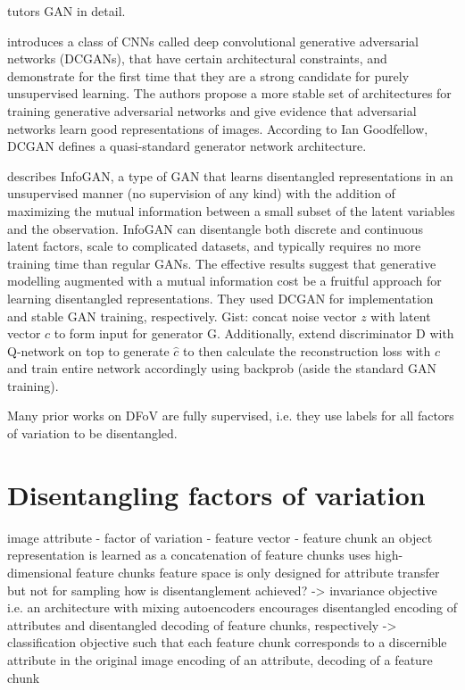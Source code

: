 \documentclass[10pt,letterpaper]{article}
\begin{document}
\par\cite{1701.00160} tutors GAN in detail. 

\par\cite{1511.06434} introduces a class of CNNs called deep convolutional generative adversarial networks (DCGANs), that have certain architectural constraints, and demonstrate for the first time that they are a strong candidate for purely unsupervised learning. The authors propose a more stable set of architectures for training generative adversarial networks and give evidence that adversarial networks learn good representations of images. According to Ian Goodfellow, DCGAN defines a quasi-standard generator network architecture. 

\par\cite{1606.03657} describes InfoGAN, a type of GAN that learns disentangled representations in an unsupervised manner (no supervision of any kind) with the addition of maximizing the mutual information between a small subset of the latent variables and the observation. InfoGAN can disentangle both discrete and continuous latent factors, scale to complicated datasets, and typically requires no more training time than regular GANs.  The effective results suggest that generative modelling augmented with a mutual information cost be a fruitful approach for learning disentangled representations. They used DCGAN for implementation and stable GAN training, respectively. Gist: concat noise vector $z$ with latent vector $c$ to form input for generator G. Additionally, extend discriminator D with Q-network on top to generate $\hat{c}$ to then calculate the reconstruction loss with $c$ and train entire network accordingly using backprob (aside the standard GAN training).

\par Many prior works on DFoV are fully supervised, i.e. they use labels for all factors of variation to be disentangled.

\section{Disentangling factors of variation}
image attribute - factor of variation - feature vector - feature chunk
an object representation is learned as a concatenation of feature chunks
uses high-dimensional feature chunks
feature space is only designed for attribute transfer but not for sampling
how is disentanglement achieved? 
-> invariance objective i.e. an architecture with mixing autoencoders encourages disentangled encoding of attributes and disentangled decoding of feature chunks, respectively
-> classification objective such that each feature chunk corresponds to a discernible attribute in the original image 
encoding of an attribute, decoding of a feature chunk
\end{document}
